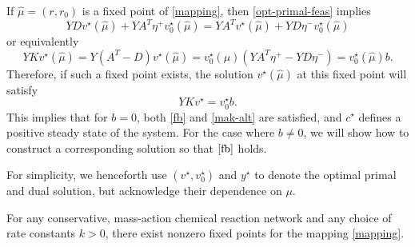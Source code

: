 \documentclass[smallextended]{svjour3}       %
\newcommand*{\0}{\mathbf{0}}
\newcommand*{\1}{\mathbf{1}}
\begin{document}
If $\hat \mu = (r, r_0)$ is a fixed point of \eqref{mapping}, then
\eqref{opt-primal-feas} implies
\[
	 YDv^\star(\hat \mu)+YA^T\eta^+v^\star_0(\hat \mu) = YA^Tv^\star(\hat \mu) +
	 	YD\eta^-v_0^\star(\hat \mu)
\]
or equivalently
\[
    Y K v^\star(\hat \mu) = Y(A^T-D)v^\star(\hat \mu) = v^\star_0(\mu)(YA^T\eta^+ - 
			YD\eta^-) = v^\star_0(\hat \mu)b.
\]
Therefore, if such a fixed point exists, the solution $v^\star(\hat\mu)$ at this
fixed point will satisfy
\begin{equation}
 YKv^\star=v^\star_0b.
  \label{scaled-fb}
\end{equation}
This implies that for $b=0$, both \eqref{fb} and \eqref{mak-alt} are
satisfied, and $c^\star$ defines a positive steady state of the system. 
For the case where $b\neq 0$, we will show how to construct a 
corresponding solution so that $\eqref{fb}$ holds.

For simplicity, we henceforth use $(v^\star,v^\star_0)$ and 
$y^\star$ to denote the optimal primal and dual solution, but acknowledge their
dependence on $\mu$.

\begin{theorem} 
	\label{fp-exist-map} 
	For any conservative, mass-action chemical reaction network and any choice
	of rate constants $k>0$, there exist nonzero fixed points for the mapping
	\eqref{mapping}.
\end{theorem} 
\end{document}
